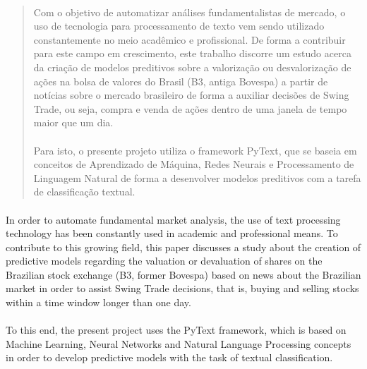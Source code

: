 \documentclass[grad,numbers]{coppe}
\begin{document}
  \begin{abstract}

	  \paragraph{}Com o objetivo de automatizar análises fundamentalistas de mercado, o uso de tecnologia para processamento de texto vem sendo utilizado constantemente no meio acadêmico\cite{nlp-academics} e profissional\cite{nlp-industry}. De forma a contribuir para este campo em crescimento, este trabalho discorre um estudo acerca da criação de modelos preditivos sobre a valorização ou desvalorização de ações na bolsa de valores do Brasil (B3, antiga Bovespa) a partir de notícias sobre o mercado brasileiro de forma a auxiliar decisões de Swing Trade, ou seja, compra e venda de ações dentro de uma janela de tempo maior que um dia.
	  \paragraph{}Para isto, o presente projeto utiliza o framework PyText, que se baseia em conceitos de Aprendizado de Máquina, Redes Neurais e Processamento de Linguagem Natural de forma a desenvolver modelos preditivos com a tarefa de classificação textual.

  \end{abstract}

  \begin{foreignabstract}

	  \paragraph{}In order to automate fundamental market analysis, the use of text processing technology has been constantly used in academic\cite{nlp-academics} and professional\cite{nlp-industry} means. To contribute to this growing field, this paper discusses a study about the creation of predictive models regarding the valuation or devaluation of shares on the Brazilian stock exchange (B3, former Bovespa) based on news about the Brazilian market in order to assist Swing Trade decisions, that is, buying and selling stocks within a time window longer than one day.
	  \paragraph{}To this end, the present project uses the PyText framework, which is based on Machine Learning, Neural Networks and Natural Language Processing concepts in order to develop predictive models with the task of textual classification.

  \end{foreignabstract}
\end{document}
